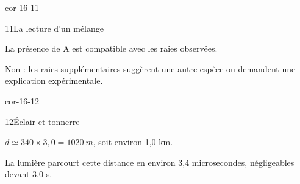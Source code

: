 \begin{blocLivre}{cor-16-11}\begin{corrige}{11}{La lecture d’un mélange}
\begin{questions}
\item La présence de A est compatible avec les raies observées.
\item Non : les raies supplémentaires suggèrent une autre espèce ou demandent une explication expérimentale.
\end{questions}
\end{corrige}\end{blocLivre}
\begin{blocLivre}{cor-16-12}\begin{corrige}{12}{Éclair et tonnerre}
\begin{questions}
\item $d\simeq340\times3,0=\qty{1020}{m}$, soit environ 1,0 km.
\item La lumière parcourt cette distance en environ 3,4 microsecondes, négligeables devant 3,0 s.
\end{questions}
\end{corrige}\end{blocLivre}

